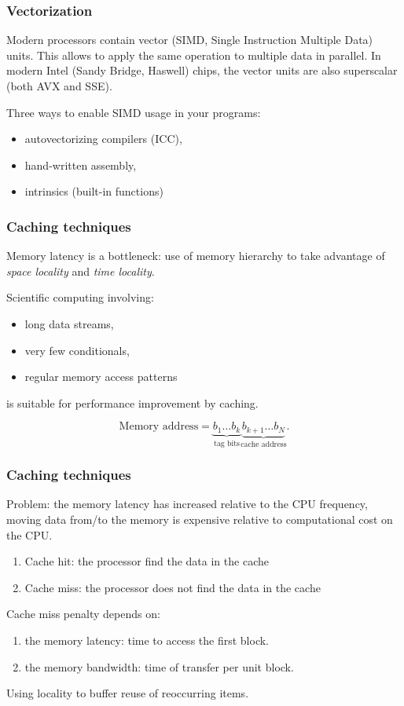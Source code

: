 \begin{frame}
  \frametitle{Vectorization}
  Modern processors contain vector (SIMD, Single Instruction Multiple Data)
  units. This allows to apply the same operation to multiple data in parallel.
  In modern Intel (Sandy Bridge, Haswell) chips, the vector units are also
  superscalar (both AVX and SSE).

  Three ways to enable SIMD usage in your programs:
  \begin{itemize}
  \item autovectorizing compilers (ICC),
  \item hand-written assembly,
  \item intrinsics (built-in functions)
  \end{itemize}
\end{frame}


\begin{frame}
  \frametitle{Caching techniques}
Memory latency is a bottleneck: use of memory hierarchy to take advantage of \textit{space locality} and \textit{time locality}.

\medskip
Scientific computing involving:
\begin{itemize}
\item long data streams,
\item very few conditionals,
\item regular memory access patterns
\end{itemize}
is suitable for performance improvement by caching.

  \begin{center}
    
  \end{center}
  \[
    \text{Memory address} =
    \underbrace{b_1 \ldots b_k}_{\text{tag bits}}
    \underbrace{b_{k+1} \ldots b_{N}}_{\text{cache address}}.
  \]
\end{frame}

\begin{frame}
  \frametitle{Caching techniques}
Problem: the memory latency has increased relative to the CPU frequency, moving data from/to the memory is expensive relative to computational cost on the CPU.

\medskip
\begin{enumerate}
\item Cache hit: the processor find the data in the cache
\item Cache miss: the processor does not find the data in the cache
\end{enumerate}

\medskip
Cache miss penalty depends on:
\begin{enumerate}
\item the memory latency: time to access the first block.
\item the memory bandwidth: time of transfer per unit block.
\end{enumerate}

Using locality to buffer reuse of reoccurring items.
\end{frame}

